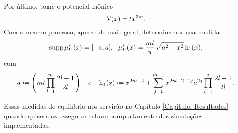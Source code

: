 

 
 Por último, tome o potencial mônico $$\operatorname{V}(x) = t x^{2m}.$$ Com o mesmo processo, apesar de mais geral, determinamos sua medida 
 \begin{equation}
 	\operatorname{supp} \mu^*_V(x) = [-a, a], \ \ \mu^*_V(x) = \frac{mt}{\pi} \sqrt{a^2 - x^2} \operatorname{h_1}(x),
 	\label{Equação: Mônico}
 \end{equation}
com $$ a \deff \left( mt \prod_{l=1}^{m} \frac{2l-1}{2l}\right) \ \ \ \text{e} \ \ \ \h(x) \deff x^{2m-2} + \sum_{j=1}^{m-1} x^{2m-2-2j} a^{2j} \prod_{l=1}^{j} \frac{2l-1}{2l}.$$

Essas medidas de equilíbrio nos servirão no Capítulo \ref{Capitulo: Resultados} quando quisermos assegurar o bom comportamento das simulações implementadas.
